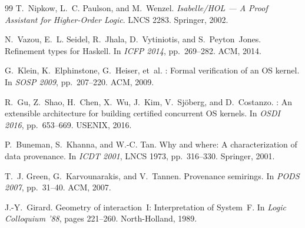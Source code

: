 \documentclass[11pt]{article}
\begin{document}
\begin{thebibliography}{99}
T.~Nipkow, L.~C. Paulson, and M.~Wenzel.
\newblock \emph{Isabelle/HOL --- A Proof Assistant for Higher-Order Logic}.
\newblock LNCS 2283. Springer, 2002.

N.~Vazou, E.~L. Seidel, R.~Jhala, D.~Vytiniotis, and S.~Peyton~Jones.
\newblock Refinement types for {Haskell}.
\newblock In \emph{ICFP 2014}, pp.~269--282. ACM, 2014.

G.~Klein, K.~Elphinstone, G.~Heiser, et~al.
: Formal verification of an {OS} kernel.
\newblock In \emph{SOSP 2009}, pp.~207--220. ACM, 2009.

R.~Gu, Z.~Shao, H.~Chen, X.~Wu, J.~Kim, V.~Sj\"oberg, and D.~Costanzo.
: An extensible architecture for building certified
  concurrent {OS} kernels.
\newblock In \emph{OSDI 2016}, pp.~653--669. USENIX, 2016.

P.~Buneman, S.~Khanna, and W.-C. Tan.
\newblock Why and where: A characterization of data provenance.
\newblock In \emph{ICDT 2001}, LNCS 1973, pp.~316--330. Springer, 2001.

T.~J. Green, G.~Karvounarakis, and V.~Tannen.
\newblock Provenance semirings.
\newblock In \emph{PODS 2007}, pp.~31--40. ACM, 2007.

J.-Y.~Girard.
\newblock Geometry of interaction~I: Interpretation of {System~F}.
\newblock In \emph{Logic Colloquium '88}, pages 221--260. North-Holland, 1989.

\end{thebibliography}
\end{document}
